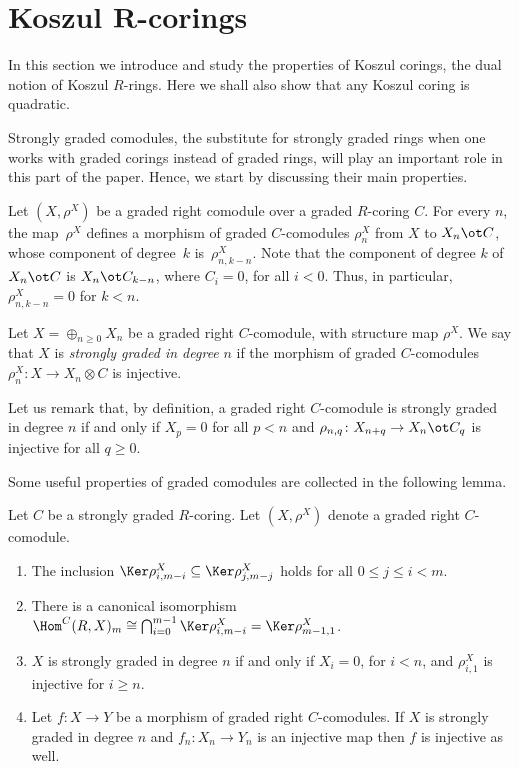\section[Koszul $R$-corings]{Koszul $\boldsymbol{R}$-corings}\label{section4}

In this section we introduce and study the properties of Koszul corings, the dual notion of Koszul $R$-rings. Here we shall also show that any Koszul coring is quadratic.

Strongly graded comodules, the substitute for strongly graded rings when one works with graded corings instead of graded rings, will play an important role in this part of the paper. Hence, we start by discussing their main properties.

Let $(X,\rho^X)$ be a graded right comodule over a graded $R$-coring $C$. For every $n$, the map~$\rho^X$ def\/ines a morphism of graded $C$-comodules $\rho_n^X$ from $X$ to $X_n\ot C$, whose component of degree~$k$ is~$\rho_{n,k-n}^X$. Note that the component of degree $k$ of $X_n\ot C$ is $X_n\ot C_{k-n}$, where $C_i=0$, for all $i<0$. Thus, in particular, $\rho_{n,k-n}^X=0$ for $k<n$.

\begin{Definition}\label{de:strongly_graded_n}
Let $X=\oplus_{n\geq 0} X_n$ be a graded right $C$-comodule, with structure map $\rho^X$. We say that $X$ is \emph{strongly graded in degree} $n$ if the morphism of graded $C$-comodules $\rho^X_{n} \colon X \rightarrow X_n \otimes C$ is injective.
\end{Definition}

Let us remark that, by def\/inition, a graded right $C$-comodule is strongly graded in degree $n$ if and only if $X_p=0$ for all $p<n$ and $\rho_{n,q}\colon X_{n+q}\to X_n\ot C_q$ is injective for all $q\geq 0$.

Some useful properties of graded comodules are collected in the following lemma.

\begin{Lemma}\label{le:strongly_graded_n}
Let $C$ be a strongly graded $R$-coring. Let $(X,\rho^X)$ denote a graded right $C$-comodule.
\begin{enumerate}\itemsep=0pt
 \item[$1.$] The inclusion $\Ker\rho^X_{i,m-i}\subseteq \Ker\rho^X_{j,m-j}$ holds for all $0\leq j\leq i < m$.

 \item[$2.$] There is a canonical isomorphism $\Hom^C(R,X)_m\cong\bigcap_{i=0}^{m-1}\Ker\rho^X_{i,m-i}=\Ker\rho^X_{m-1,1}$.

 \item[$3.$] $X$ is strongly graded in degree $n$ if and only if $X_i=0$, for $i<n$, and $\rho_{i,1}^X$ is injective for $i\geq n$.

 \item[$4.$] Let $f\colon X\to Y$ be a morphism of graded right $C$-comodules. If $X$ is strongly graded in degree $n$ and $f_n\colon X_n\to Y_n$ is an injective map then $f$ is injective as well.
 \end{enumerate}
\end{Lemma}

